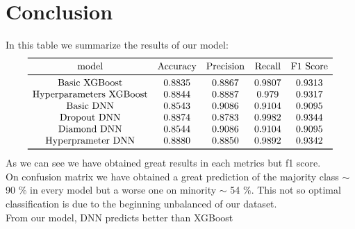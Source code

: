 \documentclass[french]{scrartcl}
\begin{document}
\section{Conclusion}
In this table we summarize the results of our model:
\[
\begin{array}{ccccc}
	\toprule
	\text{model} & \text{Accuracy} & \text{Precision} & \text{Recall} & \text{F1 Score}   \\
	\midrule
	\text{Basic XGBoost} & 0.8835 & 0.8867 & 0.9807 & 0.9313 \\
	\text{Hyperparameters XGBoost} & 0.8844 & 0.8887 & 0.979 & 0.9317 \\
	\text{Basic DNN} & 0.8543 & 0.9086 & 0.9104 & 0.9095 \\
	\text{Dropout DNN} & 0.8874 & 0.8783 & 0.9982 & 0.9344 \\
	\text{Diamond DNN} & 0.8544 & 0.9086 & 0.9104 & 0.9095 \\
	\text{Hyperprameter DNN} & 0.8880 & 0.8850 & 0.9892 & 0.9342 \\
	\bottomrule
\end{array}
\]
As we can see we have obtained great results in each metrics but f1 score.\\
On confusion matrix we have obtained a great prediction of the majority class $\sim$ 90 $\%$ in every model but a worse one on minority $\sim$ 54 $\%$.
This not so optimal classification is due to the beginning unbalanced of our dataset.\\
From our model, DNN predicts better than XGBoost
\end{document}
